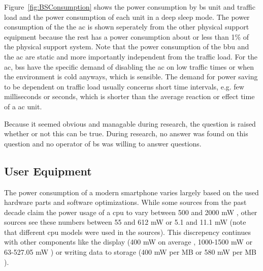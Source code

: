 \documentclass[11pt,a4paper]{article}
\begin{document}
Figure~\ref{fig:BSConsumption} shows the power consumption by \acrshort{bs} unit and traffic load and the power consumption of each unit in a deep sleep mode.
The power consumption of the the \acrshort{ac} is shown seperately from the other physical support equipment because the rest has a power consumption about or less than 1\% of the physical support system.  
Note that the power consumption of the \acrshort{bbu} and the \acrshort{ac} are static and more importantly independent from the traffic load.
For the \acrlong{ac}, \acrlong{bs}s have the specific demand of disabling the \acrshort{ac} on low traffic times or when the environment is cold anyways, which is sensible.
The demand for power saving to be dependent on traffic load usually concerns short time intervals, e.g. few milliseconds or seconds, which is shorter than the average reaction or effect time of a \acrlong{ac} unit.

Because it seemed obvious and managable during research, the question is raised whether or not this can be true.
During research, no answer was found on this question and no operator of \acrshort{bs} was willing to answer questions.

\subsection{User Equipment}\label{subsec:UEConsumption}

The power consumption of a modern smartphone varies largely based on the used hardware parts and software optimizations.
While some sources from the past decade claim the power usage of a \acrshort{cpu} to vary between 500 and 2000 mW \citep{smartphoneEnergyConsumption}, other sources see these numbers between 55 and 612 mW \citep{smartphoneEnergySurvey} or 5.1 and 11.1 mW \citep{mobileEnergyConsumption} (note that different \acrshort{cpu} models were used in the sources).
This discrepency continues with other components like the display (400 mW on average \citep{smartphoneEnergyConsumption}, 1000-1500 mW \citep{powerUsageSmartphonesQnovo} or 63-527.05 mW \citep{smartphoneEnergySurvey}) or writing data to storage (400 mW per MB \citep{powerUsageSmartphonesQnovo} or 580 mW per MB \citep{smartphoneEnergySurvey}).
\end{document}
